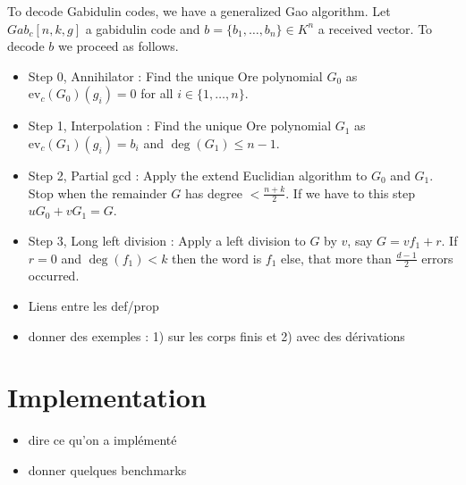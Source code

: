 \documentclass[a4paper]{llncs}
\def\todo#1{{\color{todo} #1}}
\newcommand{\ev}[1]{\textrm{ev}_{#1}}
\begin{document}
To decode Gabidulin codes, we have a generalized Gao algorithm. Let $Gab_c[n,k,g]$ a gabidulin code and $b = \{b_1, \dots, b_n\} \in K^n$ a received vector. To decode $b$ we proceed as follows.

\begin{itemize}
\item Step 0, Annihilator : Find the unique Ore polynomial $G_0$ as $\ev{c}(G_0)(g_i) = 0$ for all $i \in \{1, \dots, n\}$.
\item Step 1, Interpolation : Find the unique Ore polynomial $G_1$ as $\ev{c}(G_1)(g_i) = b_i$ and $\deg(G_1) \leqslant n-1$.
\item Step 2, Partial gcd : Apply the extend Euclidian algorithm to $G_0$ and $G_1$. Stop when the remainder $G$ has degree $< \frac{n+k}{2}$. If we have to this step $uG_0 + vG_1 = G$.
\item Step 3, Long left division : Apply a left division to $G$ by $v$, say $G = vf_1 + r$. If $r =0$ and $\deg(f_1) < k$ then the word is $f_1$ else, that more than $\frac{d-1}{2}$ errors occurred. 
\end{itemize}


\todo{\begin{itemize}
\item Liens entre les def/prop
\item donner des exemples : 1) sur les corps finis et 2) avec des dérivations
\end{itemize}}

\section{Implementation}

\todo{\begin{itemize}
\item dire ce qu'on a implémenté
\item donner quelques benchmarks
\end{itemize}}
\end{document}
